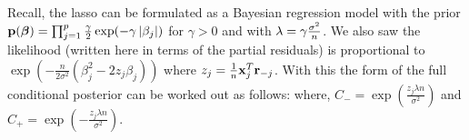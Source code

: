 Recall, the lasso can be formulated as a Bayesian regression model with the prior $\mathbf{p}(\boldsymbol{\beta}) = \prod_{j = 1}^{p} \frac{\gamma}{2}\exp(-\gamma \left\lvert\beta_j\right\rvert)$ for $\gamma > 0$ and with $\lambda = \gamma \frac{\sigma^2}{n}$. We also saw the likelihood (written here in terms of the partial residuals) is proportional to $\exp(-\frac{n}{2\sigma^2} (\beta_j^2 - 2z_j\beta_j))$ where $z_{j} = \frac{1}{n} \mathbf{x}_{j}^{T}\mathbf{r}_{-j}$.  With this the form of the full conditional posterior can be worked out as follows:
where, $C_{-} = \exp(\frac{z_j \lambda n}{\sigma^2})$ and $C_{+} = \exp(-\frac{z_j \lambda n}{\sigma^2})$.


